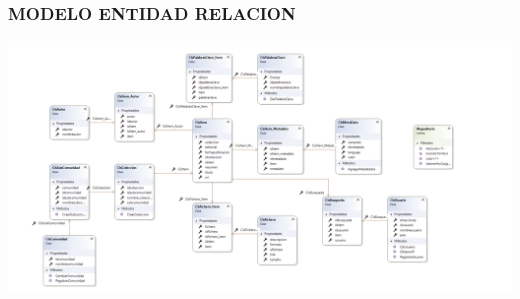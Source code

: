 \subsubsection{MODELO ENTIDAD RELACION}


\begin{center}
\includegraphics[width=20cm]{./Imagenes/Entidad}
\end{center}
